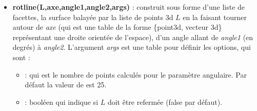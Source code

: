\begin{itemize}
\begin{demo}{Exemple avec rotcurve}
\begin{luadraw}{name=rotcurve}
local cos, sin, pi, i = math.cos, math.sin, math.pi, cpx.I
local g = graph3d:new{viewdir={30,60},size={10,10}}
g:Linejoin("round")
local p = function(t) return M(0,sin(t)+2,t) end -- courbe dans le plan yOz
local axe = {Origin,vecK}
local S = rotcurve(p,pi,-pi,axe,0,360,{grid={25,35}})
local  visible, hidden = g:Classifyfacet(S)
g:Dfacet(hidden, {mode=5,color="cyan"})
g:Dline3d(axe,"red,line width=1.2pt")
g:Dfacet(visible, {mode=5,color="cyan"})
g:Dline3d(axe,"red,line width=1.2pt,dashed")
g:Dparametric3d(p,{t={-pi,pi},draw_options="red,line width=1.2pt"})
g:Show()
\end{luadraw}
\end{demo}

\paragraph{Remarque} : si l'orientation de la surface ne semble pas bonne, il suffit d'échanger les paramètres \emph{t1} et \emph{t2}, ou bien \emph{angle1} et \emph{angle2}.

    \item \textbf{rotline(L,axe,angle1,angle2,args)} : construit sous forme d'une liste de facettes, la surface balayée par la liste de points 3d $L$ en la faisant tourner autour de \emph{axe} (qui est une table de la forme \{point3d, vecteur 3d\} représentant une droite orientée de l'espace), d'un angle allant de \emph{angle1} (en degrés) à \emph{angle2}. L'argument \emph{args} est une table pour définir les options, qui sont :
    \begin{itemize}
        \item {} : qui est le nombre de points calculés pour le paramètre angulaire. Par défaut la valeur de  est 25.
        
        \item {} : booléen qui indique si $L$ doit être refermée (false par défaut).


\end{itemize}
\end{itemize}
